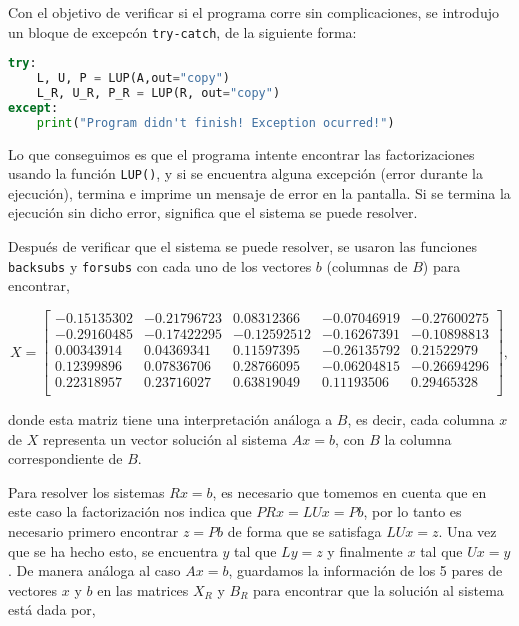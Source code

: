\documentclass{article}
\begin{document}
\begin{enumerate}
        Con el objetivo de verificar si el programa corre sin complicaciones, se introdujo un bloque
        de excepcón \texttt{try-catch}, de la siguiente forma:

        \begin{lstlisting}[language=Python]
try:
    L, U, P = LUP(A,out="copy")
    L_R, U_R, P_R = LUP(R, out="copy")
except:
    print("Program didn't finish! Exception ocurred!")\end{lstlisting}

        Lo que conseguimos es que el programa intente encontrar las factorizaciones usando la función
        \texttt{LUP()}, y si se encuentra alguna excepción (error durante la ejecución), termina e imprime
        un mensaje de error en la pantalla. Si se termina la ejecución sin dicho error, significa que el 
        sistema se puede resolver.

        Después de verificar que el sistema se puede resolver, se usaron las funciones \texttt{backsubs} 
        y \texttt{forsubs} con cada uno de los vectores $b$ (columnas de $B$) para encontrar,

        \begin{equation*}
            X = \begin{bmatrix}
                -0.15135302 & -0.21796723 & 0.08312366 & -0.07046919 & -0.27600275\\
                -0.29160485 & -0.17422295 & -0.12592512 & -0.16267391 & -0.10898813\\
                0.00343914 & 0.04369341 & 0.11597395 & -0.26135792 & 0.21522979\\
                0.12399896 & 0.07836706 & 0.28766095 & -0.06204815 & -0.26694296\\
                0.22318957 & 0.23716027 & 0.63819049 & 0.11193506 & 0.29465328\\
              \end{bmatrix},
        \end{equation*}

        donde esta matriz tiene una interpretación análoga a $B$, es decir, cada columna $x$ de $X$
        representa un vector solución al sistema $Ax = b$, con $B$ la columna correspondiente de
        $B$.

        Para resolver los sistemas $Rx = b$, es necesario que tomemos en cuenta que en este caso
        la factorización nos indica que $PRx = LUx = Pb$, por lo tanto es necesario primero
        encontrar $z = Pb$ de forma que se satisfaga $LUx = z$. Una vez que se ha hecho esto, se 
        encuentra $y$ tal que $Ly = z$ y finalmente $x$ tal que $Ux = y$. De manera análoga al caso
        $Ax = b$, guardamos la información de los 5 pares de vectores $x$ y $b$ en las matrices $X_R$
        y $B_R$ para encontrar que la solución al sistema está dada por,


\end{enumerate}
\end{document}
